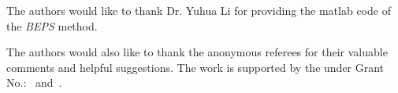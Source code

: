 \begin{acks}
  The authors would like to thank Dr. Yuhua Li for providing the
  matlab code of  the \textit{BEPS} method. 

  The authors would also like to thank the anonymous referees for
  their valuable comments and helpful suggestions. The work is
  supported by the  under Grant
  No.:~
  and~.

\end{acks}
